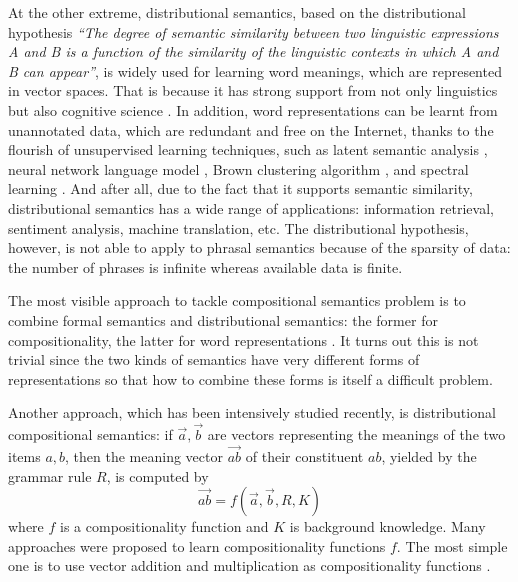 \documentclass[11pt]{article}
\begin{document}
At the other extreme, distributional semantics, based on 
the distributional hypothesis \cite{lenci_distributional_2008}
\emph{``The degree of semantic similarity between two linguistic expressions A and B is a function
of the similarity of the linguistic contexts in which A and B can appear''},
is widely used for learning word meanings, which are represented in vector spaces.
That is because it has strong support from not only linguistics but
also cognitive science \cite{lenci_distributional_2008}. In addition, word representations 
can be learnt 
from unannotated data, which are redundant and free on the Internet, thanks to 
the flourish of unsupervised learning techniques, such as  latent semantic analysis 
\cite{landauer1998introduction}, neural network 
language model \cite{collobert_natural_2011,huang2012improving}, Brown clustering
algorithm \cite{brown1992class}, and 
spectral learning \cite{dhillon2012two}. And after all, due to the fact that it supports 
semantic similarity, distributional semantics has a wide range of applications: 
information retrieval, sentiment analysis, machine translation, etc. 
The distributional hypothesis, however, is not able to apply to phrasal semantics 
because of the sparsity of data: the number of phrases is 
infinite whereas available data is finite.

The most visible approach to tackle compositional semantics problem is to combine 
formal semantics and distributional semantics: the former for compositionality, the 
latter for word representations \cite{garrette2012formal}. It turns out this is 
not trivial since the two kinds of semantics have very different forms of representations
so that how to combine these forms is itself a difficult problem.

Another approach, which has been intensively studied recently, is distributional 
compositional semantics: 
if $\overrightarrow{a}, \overrightarrow{b}$ are vectors representing the meanings of 
the two items $a,b$, then the meaning vector $\overrightarrow{ab}$ of their constituent $ab$, 
yielded by the grammar rule $R$, is computed by \cite{mitchell_vector-based_2008}
\begin{equation}
\label{equation: general composition}
    \overrightarrow{ab} = f(\overrightarrow{a}, \overrightarrow{b}, R, K)
\end{equation}
where $f$ is a compositionality function and $K$ is background knowledge.
Many approaches were proposed to learn compositionality functions $f$. 
The most simple one is to use vector addition and multiplication as compositionality functions
\cite{mitchell_vector-based_2008}. 
\end{document}
